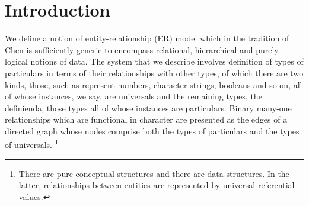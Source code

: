  \section{Introduction}

We  define a notion of entity-relationship (ER) model which in the tradition of Chen\cite{Chen1976} is sufficiently generic to encompass relational, hierarchical and purely logical  notions of data.
The system that we describe involves definition of types of particulars in terms of their relationships with other types, of which there are two kinds, those, such as represent numbers, character strings, booleans and so on, all of whose instances, we say, are universals and the remaining types, the definienda, those types all of whose instances are particulars. Binary many-one relationships which are functional in character are presented as the edges of a directed graph whose nodes comprise both the types of particulars and the types of universals. \footnote{There are pure conceptual structures and there are data structures. In the latter, relationships between entities are represented by universal
referential values.}

